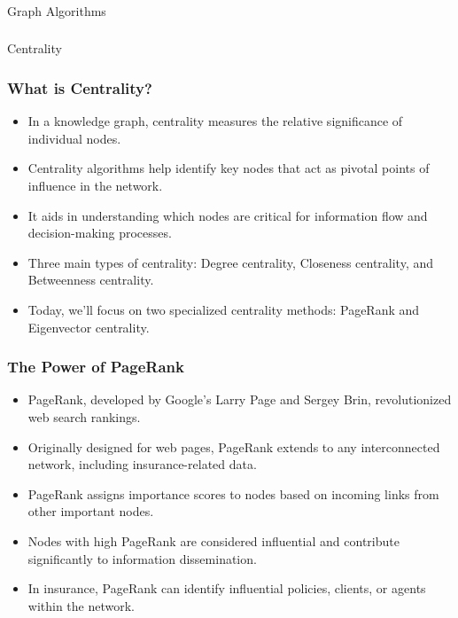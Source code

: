 \begin{frame}[fragile]\frametitle{}
\begin{center}
{\Large Graph Algorithms}
\end{center}
\end{frame}

\begin{frame}[fragile]\frametitle{}
\begin{center}
{\Large Centrality }
\end{center}
\end{frame}


\begin{frame}[fragile]\frametitle{What is Centrality?}
\begin{itemize}
\item In a knowledge graph, centrality measures the relative significance of individual nodes.
\item Centrality algorithms help identify key nodes that act as pivotal points of influence in the network.
\item It aids in understanding which nodes are critical for information flow and decision-making processes.
\item Three main types of centrality: Degree centrality, Closeness centrality, and Betweenness centrality.
\item Today, we'll focus on two specialized centrality methods: PageRank and Eigenvector centrality.
\end{itemize}
\end{frame}

\begin{frame}[fragile]\frametitle{The Power of PageRank}
\begin{itemize}
\item PageRank, developed by Google's Larry Page and Sergey Brin, revolutionized web search rankings.
\item Originally designed for web pages, PageRank extends to any interconnected network, including insurance-related data.
\item PageRank assigns importance scores to nodes based on incoming links from other important nodes.
\item Nodes with high PageRank are considered influential and contribute significantly to information dissemination.
\item In insurance, PageRank can identify influential policies, clients, or agents within the network.
\end{itemize}
\end{frame}

